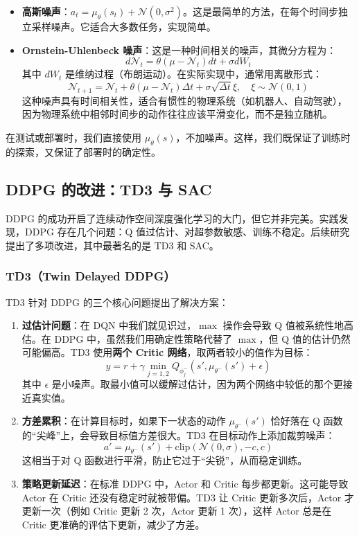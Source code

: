 \documentclass[lang=cn,zihao=-4,a4paper,fontset=windows]{beautybook}
\begin{document}
\begin{itemize}
    \item \textbf{高斯噪声}：\(a_t = \mu_\theta(s_t) + \mathcal{N}(0, \sigma^2)\)。这是最简单的方法，在每个时间步独立采样噪声。它适合大多数任务，实现简单。
    \item \textbf{Ornstein-Uhlenbeck 噪声}：这是一种时间相关的噪声，其微分方程为：
    \[
    d\mathcal{N}_t = \theta (\mu - \mathcal{N}_t) dt + \sigma dW_t
    \]
    其中 \(dW_t\) 是维纳过程（布朗运动）。在实际实现中，通常用离散形式：
    \[
    \mathcal{N}_{t+1} = \mathcal{N}_t + \theta (\mu - \mathcal{N}_t) \Delta t + \sigma \sqrt{\Delta t} \xi,\quad \xi \sim \mathcal{N}(0,1)
    \]
    这种噪声具有时间相关性，适合有惯性的物理系统（如机器人、自动驾驶），因为物理系统中相邻时间步的动作往往应该平滑变化，而不是独立随机。
\end{itemize}

在测试或部署时，我们直接使用 \(\mu_\theta(s)\)，不加噪声。这样，我们既保证了训练时的探索，又保证了部署时的确定性。

\subsection{DDPG 的改进：TD3 与 SAC}

DDPG 的成功开启了连续动作空间深度强化学习的大门，但它并非完美。实践发现，DDPG 存在几个问题：Q 值过估计、对超参数敏感、训练不稳定。后续研究提出了多项改进，其中最著名的是 TD3 和 SAC。

\subsubsection{TD3（Twin Delayed DDPG）}

TD3 针对 DDPG 的三个核心问题提出了解决方案：

\begin{enumerate}
    \item \textbf{过估计问题}：在 DQN 中我们就见识过，\(\max\) 操作会导致 Q 值被系统性地高估。在 DDPG 中，虽然我们用确定性策略代替了 \(\max\)，但 Q 值的估计仍然可能偏高。TD3 使用\textbf{两个 Critic 网络}，取两者较小的值作为目标：
    \[
    y = r + \gamma \min_{j=1,2} Q_{\phi_j^-}(s', \mu_{\theta^-}(s') + \epsilon)
    \]
    其中 \(\epsilon\) 是小噪声。取最小值可以缓解过估计，因为两个网络中较低的那个更接近真实值。

    \item \textbf{方差累积}：在计算目标时，如果下一状态的动作 \(\mu_{\theta^-}(s')\) 恰好落在 Q 函数的“尖峰”上，会导致目标值方差很大。TD3 在目标动作上添加裁剪噪声：
    \[
    a' = \mu_{\theta^-}(s') + \text{clip}(\mathcal{N}(0, \sigma), -c, c)
    \]
    这相当于对 Q 函数进行平滑，防止它过于“尖锐”，从而稳定训练。

    \item \textbf{策略更新延迟}：在标准 DDPG 中，Actor 和 Critic 每步都更新。这可能导致 Actor 在 Critic 还没有稳定时就被带偏。TD3 让 Critic 更新多次后，Actor 才更新一次（例如 Critic 更新 2 次，Actor 更新 1 次），这样 Actor 总是在 Critic 更准确的评估下更新，减少了方差。
\end{enumerate}
\end{document}
